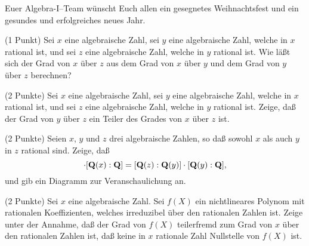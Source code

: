 \documentclass{algsheet}
\author{Dipl.-Math.~Franz Vogler}
\date{21.~Dezember 2010}
\begin{document}
                \maketitle



Euer Algebra-I--Team wünscht Euch allen ein gesegnetes Weihnachtsfest und ein gesundes und erfolgreiches 
neues Jahr. 

\begin{exercise}(1 Punkt)\newline
    Sei \(x\) eine algebraische Zahl, sei \(y\) eine algebraische Zahl, welche in
    \(x\) rational ist, und sei \(z\) eine algebraische Zahl, welche in \(y\)
    rational ist. Wie läßt sich der Grad von \(x\) über \(z\) aus dem Grad von
    \(x\) über \(y\) und dem Grad von \(y\) über \(z\) berechnen?
\end{exercise}

\begin{exercise}(2 Punkte)\newline
    Sei \(x\) eine algebraische Zahl, sei \(y\) eine algebraische Zahl, welche in
    \(x\) rational ist, und sei \(z\) eine algebraische Zahl, welche in \(y\)
    rational ist. Zeige, daß der Grad von \(y\) über \(z\) ein Teiler des Grades
    von \(x\) über \(z\) ist.
\end{exercise}

\begin{exercise}(2 Punkte)\newline
    Seien \(x\), \(y\) und \(z\) drei algebraische Zahlen, so daß
    sowohl \(x\) als auch \(y\) in \(z\) rational sind. Zeige, daß
    \begin{equation}
        [\set Q(z) : \set Q(x)] \cdot [\set Q(x) : \set Q]
        = [\set Q(z) : \set Q(y)] \cdot [\set Q(y) : \set Q],
    \end{equation}
    und gib ein Diagramm zur Veranschaulichung an.
\end{exercise}

\begin{exercise}(2 Punkte)\newline
    Sei \(x\) eine algebraische Zahl. Sei \(f(X)\) ein nichtlineares Polynom mit rationalen
    Koeffizienten, welches irreduzibel über den rationalen Zahlen ist. Zeige unter
    der Annahme, daß der Grad von \(f(X)\) teilerfremd zum Grad von \(x\) über
    den rationalen Zahlen ist, daß keine in \(x\) rationale Zahl Nullstelle von
    \(f(X)\) ist.
\end{exercise}
\end{document}
